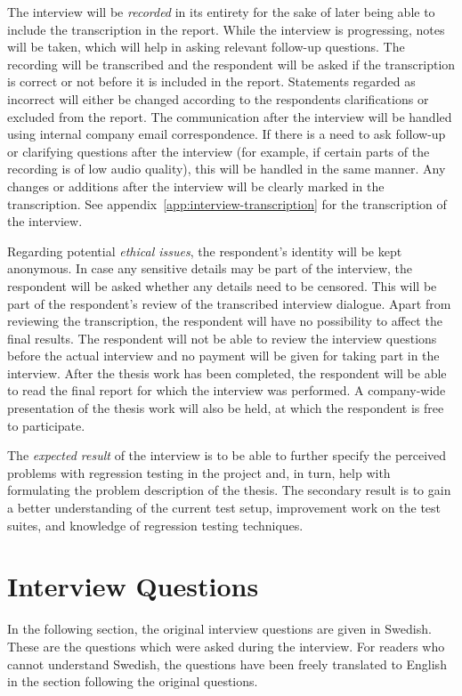The interview will be \textit{recorded} in its entirety for the sake of later being able to include the transcription in the report. While the interview is progressing, notes will be taken, which will help in asking relevant follow-up questions. The recording will be transcribed and the respondent will be asked if the transcription is correct or not before it is included in the report. Statements regarded as incorrect will either be changed according to the respondents clarifications or excluded from the report. The communication after the interview will be handled using internal company email correspondence. If there is a need to ask follow-up or clarifying questions after the interview (for example, if certain parts of the recording is of low audio quality), this will be handled in the same manner. Any changes or additions after the interview will be clearly marked in the transcription. See appendix~\vref{app:interview-transcription} for the transcription of the interview.

Regarding potential \textit{ethical issues}, the respondent's identity will be kept anonymous. In case any sensitive details may be part of the interview, the respondent will be asked whether any details need to be censored. This will be part of the respondent's review of the transcribed interview dialogue. Apart from reviewing the transcription, the respondent will have no possibility to affect the final results. The respondent will not be able to review the interview questions before the actual interview and no payment will be given for taking part in the interview. After the thesis work has been completed, the respondent will be able to read the final report for which the interview was performed. A company-wide presentation of the thesis work will also be held, at which the respondent is free to participate.

The \textit{expected result} of the interview is to be able to further specify the perceived problems with regression testing in the project and, in turn, help with formulating the problem description of the thesis. The secondary result is to gain a better understanding of the current test setup, improvement work on the test suites, and knowledge of regression testing techniques.

\tocless\section{Interview Questions}\label{app:interview-questions}
In the following section, the original interview questions are given in Swedish. These are the questions which were asked during the interview. For readers who cannot understand Swedish, the questions have been freely translated to English in the section following the original questions.

